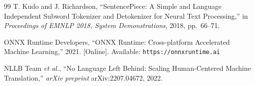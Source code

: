 {\begin{thebibliography}{99}
T. Kudo and J. Richardson, ``SentencePiece: A Simple and Language Independent
Subword Tokenizer and Detokenizer for Neural Text Processing,'' in
\textit{Proceedings of EMNLP 2018, System Demonstrations}, 2018, pp.~66--71.

ONNX Runtime Developers, ``ONNX Runtime: Cross-platform Accelerated Machine
Learning,'' 2021. [Online]. Available: \texttt{https://onnxruntime.ai}

NLLB Team \textit{et al.}, ``No Language Left Behind: Scaling Human-Centered
Machine Translation,'' \textit{arXiv preprint} arXiv:2207.04672, 2022.

\end{thebibliography}
}
\clearpage
